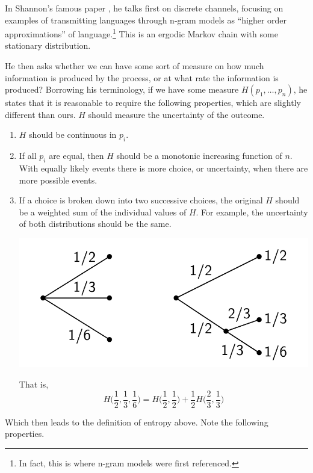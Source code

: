 \documentclass{article}
\begin{document}
    In Shannon's famous paper \cite{shannon}, he talks first on discrete channels, focusing on examples of transmitting languages through n-gram models as ``higher order approximations'' of language.\footnote{In fact, this is where n-gram models were first referenced.} This is an ergodic Markov chain with some stationary distribution. 

    He then asks whether we can have some sort of measure on how much information is produced by the process, or at what rate the information is produced? Borrowing his terminology, if we have some measure $H(p_1, \ldots, p_n)$, he states that it is reasonable to require the following properties, which are slightly different than ours. $H$ should measure the uncertainty of the outcome. 
    \begin{enumerate}
      \item $H$ should be continuous in $p_i$.  
      \item If all $p_i$ are equal, then $H$ should be a monotonic increasing function of $n$. With equally likely events there is more choice, or uncertainty, when there are more possible events. 
      \item If a choice is broken down into two successive choices, the original $H$ should be a weighted sum of the individual values of $H$. For example, the uncertainty of both distributions should be the same. 
      \begin{center}
        \includegraphics[scale=0.6]{img/same_entropy.png}
      \end{center}
      That is, 
      \begin{equation}
        H\big( \frac{1}{2}, \frac{1}{3}, \frac{1}{6} \big) = H \big(\frac{1}{2}, \frac{1}{2} \big) + \frac{1}{2} H \big( \frac{2}{3}, \frac{1}{3} \big)
      \end{equation}
    \end{enumerate}
    Which then leads to the definition of entropy above. Note the following properties. 
\end{document}
